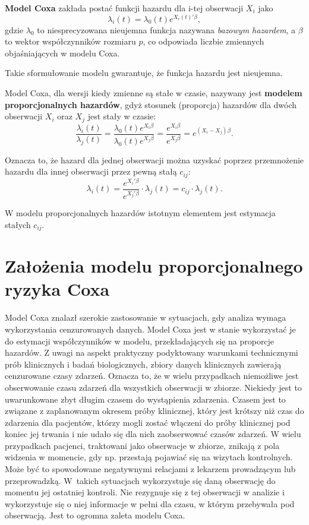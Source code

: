 \begin{definition}\label{defi:koksik}
\textbf{Model Coxa} zakłada postać funkcji hazardu dla i-tej obserwacji $X_i$ jako
\begin{equation}\label{eq:haz}
\lambda_i(t) = \lambda_0(t)e^{X_i(t)'\beta},
\end{equation}
gdzie $\lambda_0$ to niesprecyzowana nieujemna funkcja nazywana \textit{bazowym hazardem}, a $\beta$ to wektor współczynników rozmiaru $p$, co odpowiada liczbie zmiennych objaśniających w modelu Coxa.
\end{definition}

Takie sformułowanie modelu gwarantuje, że funkcja hazardu jest nieujemna. 


Model Coxa, dla wersji kiedy zmienne są stałe w czasie, nazywany jest \textbf{modelem proporcjonalnych hazardów}, gdyż stosunek (proporcja) hazardów dla dwóch obserwacji $X_i$ oraz $X_j$ jest stały w czasie:  
$$\dfrac{\lambda_i(t)}{\lambda_j(t)} = \dfrac{\lambda_0(t)e^{X_i\beta}}{\lambda_0(t)e^{X_j\beta}} = \dfrac{e^{X_i\beta}}{e^{X_j\beta}} = e^{(X_i-X_j)\beta}.$$

Oznacza to, że hazard dla jednej obserwacji można uzyskać poprzez przemnożenie hazardu dla innej obserwacji przez pewną stałą $c_{ij}$:
$$\lambda_i(t) = \dfrac{e^{X_i'\beta}}{e^{X_j'\beta}} \cdot \lambda_j(t) = c_{ij} \cdot \lambda_j(t).$$

W modelu proporcjonalnych hazardów istotnym elementem jest estymacja stałych $c_{ij}$.

\section{Założenia modelu proporcjonalnego ryzyka Coxa}

Model Coxa znalazł szerokie zastosowanie w sytuacjach, gdy analiza wymaga wykorzystania cenzurowanych danych. Model Coxa jest w stanie wykorzystać je do estymacji współczynników w modelu, przekładających się na proporcje hazardów. Z uwagi na aspekt praktyczny podyktowany warunkami technicznymi prób klinicznych i badań biologicznych, zbiory danych klinicznych zawierają cenzurowane czasy zdarzeń. Oznacza to, że w wielu przypadkach niemożliwe jest obserwowanie czasu zdarzeń dla wszystkich obserwacji w zbiorze. Niekiedy jest to uwarunkowane zbyt długim czasem do wystąpienia zdarzenia. Czasem jest to związane z zaplanowanym okresem próby klinicznej, który jest krótszy niż czas do zdarzenia dla pacjentów, którzy mogli zostać włączeni do próby klinicznej pod koniec jej trwania i nie udało się dla nich zaobserwować czasów zdarzeń. W wielu przypadkach pacjenci, traktowani jako obserwacje w zbiorze, znikają z pola widzenia w momencie, gdy np. przestają pojawiać się na wizytach kontrolnych. Może być to spowodowane negatywnymi relacjami z lekarzem prowadzącym lub przeprowadzką. W~takich sytuacjach wykorzystuje się daną obserwację do momentu jej ostatniej kontroli. Nie rezygnuje się z tej obserwacji w analizie i wykorzystuje się o niej informacje w pełni dla czasu, w którym przebywała pod obserwacją. Jest to ogromna zaleta modelu Coxa.

